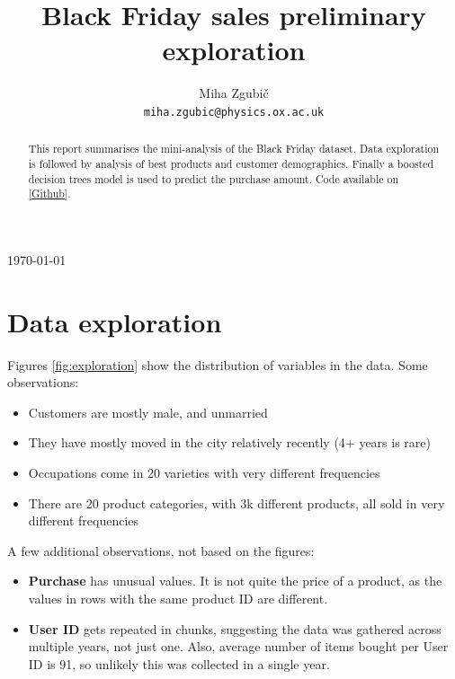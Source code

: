 \documentclass{article}
\title{Black Friday sales preliminary exploration}
\author{%
  Miha Zgubi\v{c}\\
  \texttt{miha.zgubic@physics.ox.ac.uk} \\
}
\begin{document}
\maketitle

\begin{abstract}
  This report summarises the mini-analysis of the Black Friday dataset. Data exploration is followed by analysis of best products and customer demographics. Finally a boosted decision trees model is used to predict the purchase amount. Code available on \href{https://github.com/mzgubic/black-friday}{[Github]}.
\end{abstract}

\bigskip
\begin{center}
\today
\end{center}


\newpage
\linespread{1.0}
\noindent \hrulefill 
\tableofcontents
\smallskip
\noindent \hrulefill
\linespread{1.3}

\bigskip
\section{Data exploration}

Figures \ref{fig:exploration} show the distribution of variables in the data. Some observations:
\begin{itemize}
\item Customers are mostly male, and unmarried
\item They have mostly moved in the city relatively recently (4+ years is rare)
\item Occupations come in 20 varieties with very different frequencies
\item There are 20 product categories, with 3k different products, all sold in very different frequencies
\end{itemize}
A few additional observations, not based on the figures:
\begin{itemize}
\item \textbf{Purchase} has unusual values. It is not quite the price of a product, as the values in rows with the same product ID are different. 
\item \textbf{User ID} gets repeated in chunks, suggesting the data was gathered across multiple years, not just one. Also, average number of items bought per User ID is 91, so unlikely this was collected in a single year. 
\end{itemize}
\end{document}
